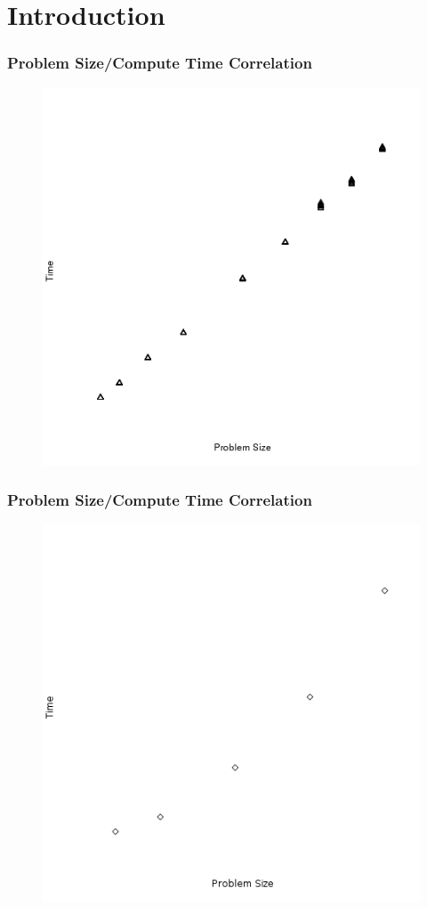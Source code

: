 

\section{Introduction}

\begin{frame}
		\frametitle{Problem Size/Compute Time Correlation}
			\begin{figure}
					\includegraphics[width=0.65\linewidth]{figures/time/linpack}
			\end{figure}
\end{frame}

\begin{frame}
		\frametitle{Problem Size/Compute Time Correlation}
			\begin{figure}
					\includegraphics[width=0.65\linewidth]{figures/time/laplace}
			\end{figure}
\end{frame}

